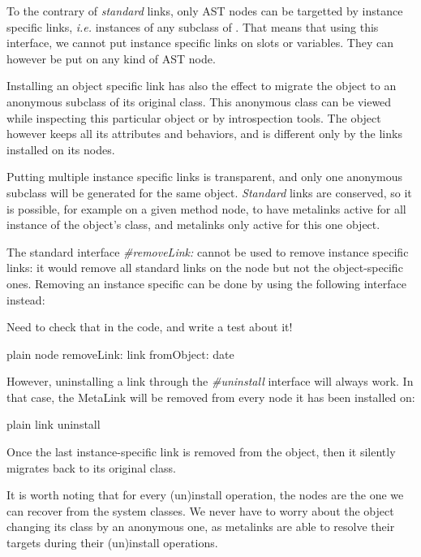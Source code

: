 \documentclass[10pt,twoside,english]{_support/latex/sbabook/sbabook}
\begin{document}
To the contrary of \textit{standard} links, only AST nodes can be targetted by instance specific links, \textit{i.e.} instances of any subclass of . That means that using this interface, we cannot put instance specific links on slots or variables. They can however be put on any kind of AST node.

Installing an object specific link has also the effect to migrate the object to an anonymous subclass of its original class. This anonymous class can be viewed while inspecting this particular object or by introspection tools. The object however keeps all its attributes and behaviors, and is different only by the links installed on its nodes.

Putting multiple instance specific links is transparent, and only one anonymous subclass will be generated for the same object. \textit{Standard} links are conserved, so it is possible, for example on a given method node, to have metalinks active for all instance of the object's class, and metalinks only active for this one object.

The standard interface \textit{\#removeLink:} cannot be used to remove instance specific links: it would remove all standard links on the node but not the object-specific ones. Removing an instance specific can be done by using the following interface instead:

\begin{todo}
Need to check that in the code, and write a test about it!
\end{todo}

\begin{displaycode}{plain}
node removeLink: link fromObject: date
\end{displaycode}

However, uninstalling a link through the \textit{\#uninstall} interface will always work. In that case, the MetaLink will be removed from every node it has been installed on:

\begin{displaycode}{plain}
link uninstall
\end{displaycode}

Once the last instance-specific link is removed from the object, then it silently migrates back to its original class.

It is worth noting that for every (un)install operation, the nodes are the one we can recover from the system classes. We never have to worry about the object changing its class by an anonymous one, as metalinks are able to resolve their targets during their (un)install operations.
\end{document}
